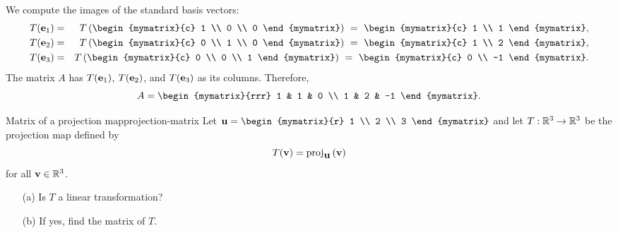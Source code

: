 \begin{solution}
  We compute the images of the standard basis vectors:
  \begin{eqnarray*}
    T(\vect{e}_1)
    &=& T\tup{\begin{mymatrix}{c} 1 \\ 0 \\ 0 \end{mymatrix}}
    ~=~ \begin{mymatrix}{c} 1 \\ 1 \end{mymatrix},\\
    T(\vect{e}_2)
    &=& T\tup{\begin{mymatrix}{c} 0 \\ 1 \\ 0 \end{mymatrix}}
    ~=~ \begin{mymatrix}{c} 1 \\ 2 \end{mymatrix},\\
    T(\vect{e}_3)
    &=& T\tup{\begin{mymatrix}{c} 0 \\ 0 \\ 1 \end{mymatrix}}
    ~=~ \begin{mymatrix}{c} 0 \\ -1 \end{mymatrix}.
  \end{eqnarray*}
  The matrix $A$ has $T(\mbox{\bf e}_1)$, $T(\mbox{\bf e}_2)$, and
  $T(\mbox{\bf e}_3)$ as its columns. Therefore,
  \begin{equation*}
    A=\begin{mymatrix}{rrr}
      1 & 1 & 0 \\
      1 & 2 & -1
    \end{mymatrix}.
  \end{equation*}
\end{solution}

\begin{example}{Matrix of a projection map}{projection-matrix}
  Let $\vect{u} = \begin{mymatrix}{r} 1 \\ 2 \\ 3 \end{mymatrix}$ and
  let $T: \mathbb{R}^3 \to \mathbb{R}^3$ be the projection%
   map defined by
  \begin{equation*}
    T(\vect{v}) = \proj_{\vect{u}}\tup{\vect{v}}
  \end{equation*}
  for all $\mbox{\bf v} \in \mathbb{R}^3$.
  \begin{enumerate}
  \item[(a)] Is $T$ a linear transformation?
  \item[(b)] If yes, find the matrix of $T$.
  \end{enumerate}
\end{example}

